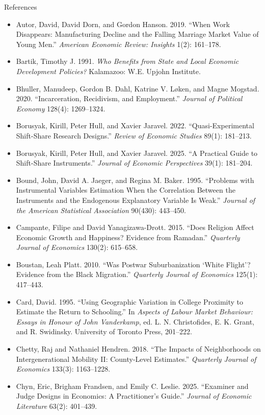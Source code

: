 \documentclass[aspectratio=169,11pt,xcolor=dvipsnames]{beamer}
\begin{document}
\begin{frame}[allowframebreaks,t]{References}
\begin{itemize}
\item Autor, David, David Dorn, and Gordon Hanson. 2019. ``When Work Disappears: Manufacturing Decline and the Falling Marriage Market Value of Young Men.'' \textit{American Economic Review: Insights} 1(2): 161--178.
\item Bartik, Timothy J. 1991. \textit{Who Benefits from State and Local Economic Development Policies?} Kalamazoo: W.E. Upjohn Institute.
\item Bhuller, Manudeep, Gordon B. Dahl, Katrine V. L\o ken, and Magne Mogstad. 2020. ``Incarceration, Recidivism, and Employment.'' \textit{Journal of Political Economy} 128(4): 1269--1324.
\item Borusyak, Kirill, Peter Hull, and Xavier Jaravel. 2022. ``Quasi-Experimental Shift-Share Research Designs.'' \textit{Review of Economic Studies} 89(1): 181--213.
\item Borusyak, Kirill, Peter Hull, and Xavier Jaravel. 2025. ``A Practical Guide to Shift-Share Instruments.'' \textit{Journal of Economic Perspectives} 39(1): 181--204.
\item Bound, John, David A. Jaeger, and Regina M. Baker. 1995. ``Problems with
Instrumental Variables Estimation When the Correlation Between the Instruments
and the Endogenous Explanatory Variable Is Weak.'' \textit{Journal of the
American Statistical Association} 90(430): 443--450.
\item Campante, Filipe and David Yanagizawa-Drott. 2015. ``Does Religion Affect Economic Growth and Happiness? Evidence from Ramadan.'' \textit{Quarterly Journal of Economics} 130(2): 615--658.
\item Boustan, Leah Platt. 2010. ``Was Postwar Suburbanization `White Flight'? Evidence from the Black Migration.'' \textit{Quarterly Journal of Economics} 125(1): 417--443.
\item Card, David. 1995. ``Using Geographic Variation in College Proximity to Estimate the Return to Schooling.'' In \textit{Aspects of Labour Market Behaviour: Essays in Honour of John Vanderkamp}, ed. L. N. Christofides, E. K. Grant, and R. Swidinsky. University of Toronto Press, 201--222.
\item Chetty, Raj and Nathaniel Hendren. 2018. ``The Impacts of Neighborhoods on Intergenerational Mobility II: County-Level Estimates.'' \textit{Quarterly Journal of Economics} 133(3): 1163--1228.
\item Chyn, Eric, Brigham Frandsen, and Emily C. Leslie. 2025. ``Examiner and Judge Designs in Economics: A Practitioner's Guide.'' \textit{Journal of Economic Literature} 63(2): 401--439.

\end{itemize}
\end{frame}
\end{document}
